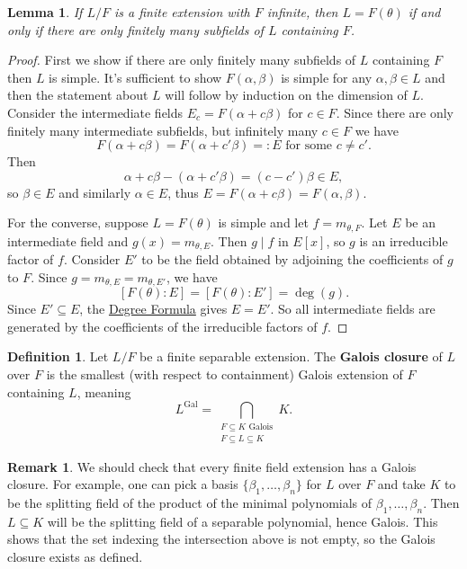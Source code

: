 \documentclass[12pt]{report}
\newtheorem{lemma}[theorem]{Lemma}
\numberwithin{equation}{section}
\numberwithin{theorem}{chapter}
\theoremstyle{definition}
\newtheorem{definition}[theorem]{Definition}
\newtheorem*{basic properties}{Basic Properties}
\newtheorem*{Important Remark}{Important Remark}
\newtheorem{remark}[theorem]{Remark}
\newcommand{\df}[1]{{\bf #1}\index{#1}}
\DeclareMathOperator{\Gal}{Gal}
\begin{document}
\begin{lemma}\label{lemma simple extension}
If $L/F$ is a finite extension with $F$ infinite, then $L=F(\theta)$ if and only if there are only finitely many subfields of $L$ containing $F$.
\end{lemma}


\begin{proof}
First we show if there are only finitely many subfields of $L$ containing $F$ then $L$ is simple. It's sufficient to show $F(\alpha,\beta)$ is simple for any $\alpha,\beta\in L$ and then the statement about $L$ will follow by induction on the dimension of $L$. Consider the intermediate fields $E_c=F(\alpha+c\beta)$ for $c\in F$. Since there are only finitely many intermediate subfields, but infinitely many $c\in F$ we have 
$$F(\alpha+c\beta)=F(\alpha+c'\beta)=:E \text{ for some } c\neq c'.$$
Then 
$$\alpha+c\beta-(\alpha+c'\beta)=(c-c')\beta\in E,$$ 
so $\beta \in E$ and similarly $\alpha \in E$, thus $E=F(\alpha+c\beta)=F(\alpha,\beta)$.

For the converse, suppose $L=F(\theta)$ is simple and let $f=m_{\theta,F}$. Let $E$ be an intermediate field and $g(x)=m_{\theta,E}$. Then $g \mid f$ in $E[x]$, so $g$ is an irreducible factor of $f$. Consider $E'$ to be the field obtained by adjoining the coefficients of $g$ to $F$. Since $g = m_{\theta,E} = m_{\theta,E'}$, we have 
$$[F(\theta):E]=[F(\theta):E']=\deg(g).$$ 
Since $E'\subseteq E$, the \hyperref[deg formula]{Degree Formula} gives $E=E'$. So all intermediate fields are generated by the coefficients of the irreducible factors of $f$.
\end{proof}


\begin{definition}\index{$L^{\Gal}$}
Let $L/F$ be a finite separable extension. The \df{Galois closure} of $L$ over $F$ is the smallest (with respect to containment) Galois extension of $F$ containing $L$, meaning
$$L^{\Gal} = \bigcap_{\substack{F \subseteq K \text{ Galois} \\ F\subseteq L \subseteq K}} K.$$
\end{definition}

\begin{remark}
We should check that every finite field extension has a Galois closure.
For example, one can pick a basis $\{\beta_1,\ldots,\beta_n\}$ for $L$ over $F$ and take $K$ to be the splitting field of the product of the minimal polynomials of $\beta_1,\ldots,\beta_n$. Then $L \subseteq K$ will be the splitting field of a separable polynomial, hence Galois. 
This shows that the set indexing the intersection above is not empty, so the Galois closure exists as defined.
\end{remark}
\end{document}
